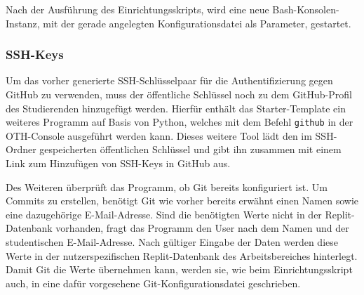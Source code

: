 Nach der Ausführung des Einrichtungsskripts, wird eine neue
Bash-Konsolen-Instanz, mit der gerade angelegten Konfigurationsdatei als
Parameter, gestartet.

\subsubsection{SSH-Keys}\label{replit-template-ssh-keys}
Um das vorher generierte SSH-Schlüsselpaar für die Authentifizierung gegen
GitHub zu verwenden, muss der öffentliche Schlüssel noch zu dem GitHub-Profil
des Studierenden hinzugefügt werden. Hierfür enthält das Starter-Template ein
weiteres Programm auf Basis von Python, welches mit dem Befehl \texttt{github}
in der OTH-Console ausgeführt werden kann. Dieses weitere Tool lädt den im
SSH-Ordner gespeicherten öffentlichen Schlüssel und gibt ihn zusammen mit einem
Link zum Hinzufügen von SSH-Keys in GitHub aus.

Des Weiteren überprüft das Programm, ob Git bereits konfiguriert ist. Um Commits
zu erstellen, benötigt Git wie vorher bereits erwähnt einen Namen sowie eine
dazugehörige E-Mail-Adresse. Sind die benötigten Werte nicht in der
Replit-Datenbank vorhanden, fragt das Programm den User nach dem Namen und der 
studentischen E-Mail-Adresse. Nach gültiger Eingabe der Daten werden diese Werte
in der nutzerspezifischen Replit-Datenbank des Arbeitsbereiches hinterlegt.
Damit Git die Werte übernehmen kann, werden sie, wie beim Einrichtungsskript
auch, in eine dafür vorgesehene Git-Konfigurationsdatei geschrieben.